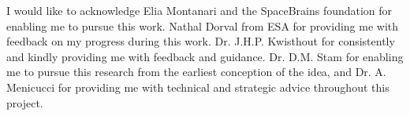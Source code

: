 \begin{acks}
  I would like to acknowledge Elia Montanari and the SpaceBrains foundation for enabling me to pursue this work. Nathal Dorval from ESA for providing me with feedback on my progress during this work. Dr. J.H.P. Kwisthout for consistently and kindly providing me with feedback and guidance. Dr. D.M. Stam for enabling me to pursue this research from the earliest conception of the idea, and Dr. A. Menicucci for providing me with technical and strategic advice throughout this project.
\end{acks}